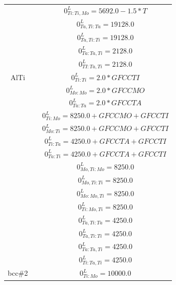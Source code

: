 \begin{longtable}[H]{ c c c }
                              & \cite{Ansara1998} & $0^\textit{L}_{Ti:Ti,Mo} = 5692.0-1.5*T$\\
                              & \cite{Ansara1998} & $0^\textit{L}_{Ta,Ti:Ta} = 19128.0$\\
                              & \cite{Ansara1998} & $0^\textit{L}_{Ta,Ti:Ti} = 19128.0$\\
                              & \cite{Ansara1998} & $0^\textit{L}_{Ta:Ta,Ti} = 2128.0$\\
                              & \cite{Ansara1998} & $0^\textit{L}_{TI:Ta,Ti} = 2128.0$\\
                       AlTi & \cite{Ansara1998} & $0^\textit{L}_{Ti:Ti} = 2.0*GFCCTI$\\
                              & \cite{Ansara1998} & $0^\textit{L}_{Mo:Mo} = 2.0*GFCCMO$\\
                              & \cite{Ansara1998} & $0^\textit{L}_{Ta:Ta} = 2.0*GFCCTA$\\
                              & \cite{Ansara1998} & $0^\textit{L}_{Ti:Mo} = 8250.0+GFCCMO+GFCCTI$\\
                              & \cite{Ansara1998} & $0^\textit{L}_{Mo:Ti} = 8250.0+GFCCMO+GFCCTI$\\
                              & \cite{Ansara1998} & $0^\textit{L}_{Ti:Ta} = 4250.0+GFCCTA+GFCCTI$\\
                              & \cite{Ansara1998} & $0^\textit{L}_{Ta:Ti} = 4250.0+GFCCTA+GFCCTI$\\
                              & \cite{Ansara1998} & $0^\textit{L}_{Mo,Ti:Mo} = 8250.0$\\
                              & \cite{Ansara1998} & $0^\textit{L}_{Mo,Ti:Ti} = 8250.0$\\
                        & \cite{Ansara1998} & $0^\textit{L}_{Mo:Mo,Ti} = 8250.0$\\
                        & \cite{Ansara1998} & $0^\textit{L}_{Ti:Mo,Ti} = 8250.0$\\
                        & \cite{Ansara1998} & $0^\textit{L}_{Ta,Ti:Ta} = 4250.0$\\
                        & \cite{Ansara1998} & $0^\textit{L}_{Ta,Ti:Ti} = 4250.0$\\
                        & \cite{Ansara1998} & $0^\textit{L}_{Ta:Ta,Ti} = 4250.0$\\
                        & \cite{Ansara1998} & $0^\textit{L}_{Ti:Ta,Ti} = 4250.0$\\
      bcc\#2 & \cite{Ansara1998} & $0^\textit{L}_{Ti:Mo} = 10000.0$\\

\end{longtable}
